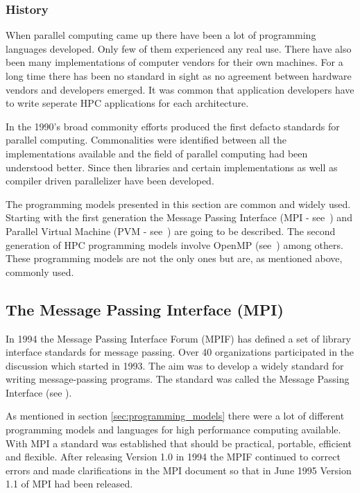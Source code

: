 \subsubsection{History}
When parallel computing came up there have been a lot of programming
languages developed. Only few of them experienced any real use. There
have also been many implementations of computer vendors for their own
machines. For a long time there has been no standard in sight as no
agreement between hardware vendors and developers emerged. It was
common that application developers have to write seperate HPC
applications for each architecture.

In the 1990's broad commonity efforts produced the first defacto
standards for parallel computing. Commonalities were identified
between all the implementations available and the field of parallel
computing had been understood better. Since then libraries and certain
implementations as well as compiler driven parallelizer have been
developed.


The programming models presented in this section are common and widely
used. Starting with the first generation the Message Passing Interface
(MPI - see~\cite{forum94:MPI}) and Parallel Virtual Machine (PVM -
see~\cite{geist94pvm})
are going to be described. The second generation of HPC programming
models involve OpenMP (see~\cite{openMP05}) among others. These
programming models are not the only ones 
but are, as mentioned above, commonly used. 

\subsection{The Message Passing Interface (MPI)}
\label{sec:MPI}

In 1994 the Message Passing Interface Forum (MPIF) has defined a set
of library interface standards for message passing. Over 40
organizations participated in the discussion which started in
1993. The aim was to develop a widely standard for writing
message-passing programs. The standard was called the Message Passing
Interface (see \cite{forum94:MPI}).

As mentioned in section \ref{sec:programming_models} there
were a lot of different programming models and languages for high
performance computing available. With MPI a standard was established
that should be practical, portable, efficient and flexible. After
releasing Version 1.0 in 1994 the MPIF continued to correct errors and
made clarifications in the MPI document so that in June 1995 Version
1.1 of MPI had been released.

